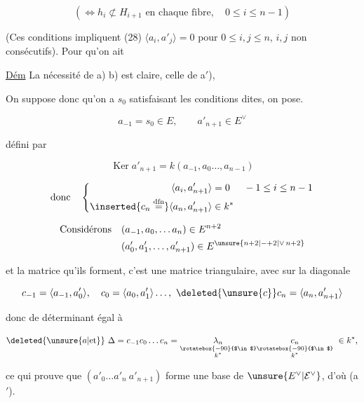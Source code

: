 \[(\Longleftrightarrow h_i\not\subset H_{i+1}\text{ en chaque fibre},\quad0\leq i\leq n-1)\]

(Ces conditions impliquent  (28) $\langle a_i,a'_j\rangle=0$ pour $0\leq i,j\leq n$, $i,j$ non consécutifs). Pour qu'on ait

\uline{Dém} La nécessité de a) b)  est claire,   celle de a$'$), 

On suppose donc qu'on a $s_0$ satisfaisant les conditions dites, on pose. 

\[a_{-1}=s_0\in E,\qquad a'_{n+1}\in E^\vee\]

défini par

\[\operatorname{Ker}a'_{n+1}=k(a_{-1},a_0\ldots,a_{n-1})\]

\[\text{donc}\quad\left\{\begin{aligned}\langle a_i,a'_{n+1}\rangle&=0&&-1\leq i\leq n-1\\ \inserted{c_n\overset{\mathrm{dfn}}{=}}\langle a_n,a'_{n+1}\rangle&\in k^*\end{aligned}\right.\]

\[\begin{aligned}\text{Considérons}\quad &(a_{-1},a_0,\ldots a_n)\in E^{n+2}\\ &(a'_0,a'_1,\ldots,a'_{n+1})\in E^{\unsure{n+2|-+2|\vee\,n+2}}\end{aligned}\]

et la matrice qu'ils forment, c'est une matrice triangulaire, avec sur la diagonale


\[c_{-1}=\langle a_{-1},a'_0\rangle,\quad c_0=\langle a_0,a'_1\rangle\ldots,\ \deleted{\unsure{c}}c_n=\langle a_n,a'_{n+1}\rangle\]

donc de déterminant égal à

\[\deleted{\unsure{a|\text{et}}}\ \Delta=c_{-1}c_0\ldots c_n=\underset{\substack{\rotatebox{-90}{$\in$}\\ k^*}}{\lambda_n}\underset{\substack{\rotatebox{-90}{$\in$}\\ k^*}}{c_n}\ \in k^*,\]

ce qui prouve que  $(a'_0\ldots a'_n\ a'_{n+1})$ forme une base de $\unsure{E^\vee|\mathcal E^\vee}$, d'où (a$'$).

